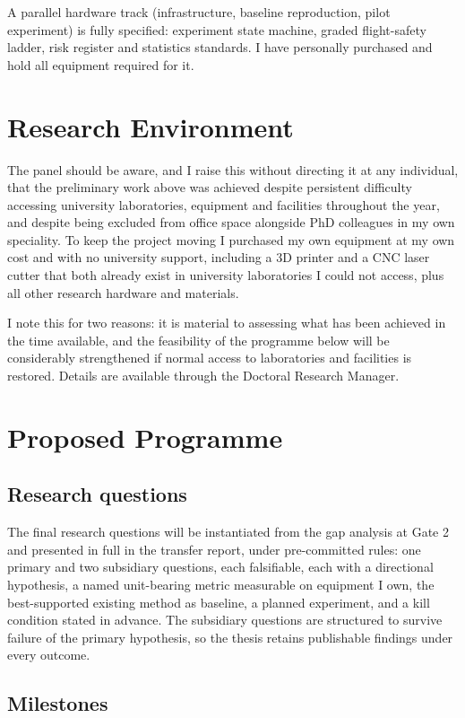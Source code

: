 \documentclass[11pt,a4paper]{article}
\begin{document}
A parallel hardware track (infrastructure, baseline reproduction, pilot experiment) is fully specified: experiment state machine, graded flight-safety ladder, risk register and statistics standards. I have personally purchased and hold all equipment required for it.

\section{Research Environment}

The panel should be aware, and I raise this without directing it at any individual, that the preliminary work above was achieved despite persistent difficulty accessing university laboratories, equipment and facilities throughout the year, and despite being excluded from office space alongside PhD colleagues in my own speciality. To keep the project moving I purchased my own equipment at my own cost and with no university support, including a 3D printer and a CNC laser cutter that both already exist in university laboratories I could not access, plus all other research hardware and materials.

I note this for two reasons: it is material to assessing what has been achieved in the time available, and the feasibility of the programme below will be considerably strengthened if normal access to laboratories and facilities is restored. Details are available through the Doctoral Research Manager.

\section{Proposed Programme}

\subsection{Research questions}

The final research questions will be instantiated from the gap analysis at Gate 2 and presented in full in the transfer report, under pre-committed rules: one primary and two subsidiary questions, each falsifiable, each with a directional hypothesis, a named unit-bearing metric measurable on equipment I own, the best-supported existing method as baseline, a planned experiment, and a kill condition stated in advance. The subsidiary questions are structured to survive failure of the primary hypothesis, so the thesis retains publishable findings under every outcome.

\subsection{Milestones}
\end{document}

